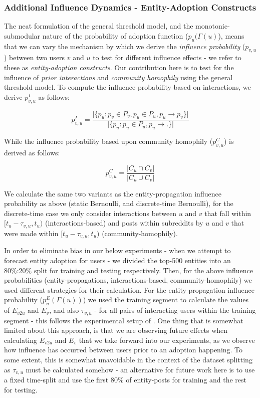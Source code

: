 \documentclass[10pt,journal,compsoc]{IEEEtran}
\begin{document}
\subsubsection{Additional Influence Dynamics - Entity-Adoption Constructs}
The neat formulation of the general threshold model, and the monotonic-submodular nature of the probability of adoption function ($p_u(\Gamma(u)$), means that we can vary the mechanism by which we derive the \emph{influence probability} ($p_{v,u}$) between two users $v$ and $u$ to test for different influence effects - we refer to these as \emph{entity-adoption constructs}.
Our contribution here is to test for the influence of \emph{prior interactions} and \emph{community homophily} using the general threshold model.
To compute the influence probability based on interactions, we derive $p^I_{v,u}$ as follows:

\begin{equation}
p^{I}_{v,u} = \frac{\vert \{ p_u : p_v \in P_v, p_u \in P_u, p_u \rightarrow p_v \} \vert}{\vert \{ p_u : p_u \in P_u, p_u \rightarrow . \} \vert}
\end{equation}

While the influence probability based upon community homophily ($p_{v,u}^C$) is derived as follows:

\begin{equation}
p^C_{v,u} = \frac{\vert C_u \cap C_v \vert}{\vert C_u \cup C_v \vert}
\end{equation}

We calculate the same two variants as the entity-propagation influence probability as above (static Bernoulli, and discrete-time Bernoulli), for the discrete-time case we only consider interactions between $u$ and $v$ that fall within $[t_u - \tau_{v,u}, t_u)$ (interactions-based) and posts within subreddits by $u$ and $v$ that were made within $[t_u - \tau_{v,u}, t_u)$ (community-homophily).

In order to eliminate bias in our below experiments - when we attempt to forecast entity adoption for users - we divided the top-500 entities into an 80\%:20\% split for training and testing respectively.
Then, for the above influence probabilities (entity-propagations, interactions-based, community-homophily) we used different strategies for their calculation.
For the entity-propagation influence probability ($p^E_u(\Gamma(u))$) we used the training segment to calculate the values of $E_{v2u}$ and $E_v$, and also $\tau_{v,u}$ - for all pairs of interacting users within the training segment - this follows the experimental setup of \cite{goyal2010learning}.
One thing that is somewhat limited about this approach, is that we are observing future effects when calculating $E_{v2u}$ and $E_v$ that we take forward into our experiments, as we observe how influence has occurred between users prior to an adoption happening.
To some extent, this is somewhat unavoidable in the context of the dataset splitting as $\tau_{v,u}$ must be calculated somehow - an alternative for future work here is to use a fixed time-split and use the first 80\% of entity-posts for training and the rest for testing.
\end{document}
